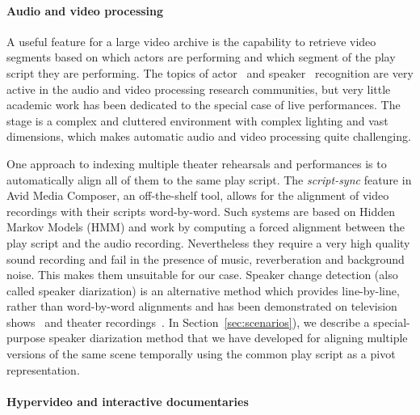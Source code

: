 \documentclass[conference]{IEEEtran}
\begin{document}

\paragraph*{Audio and video processing}
A useful feature for a large video archive is the capability to retrieve video segments based on which actors 
are performing and which segment of the play script they are performing. The topics of actor~\cite{Hilton06} and speaker~\cite{Miro12} recognition are very active in the audio and video processing research communities, but very little academic 
work has been dedicated to the special case of live performances. The stage is a complex and cluttered environment 
with complex lighting and vast dimensions, which makes automatic audio and video processing quite challenging. 

One approach to indexing multiple theater rehearsals and performances is to automatically align
all of them to the same play script. The {\em script-sync} feature in Avid Media Composer,
an off-the-shelf tool, allows for the alignment of video recordings with their scripts word-by-word. Such systems
are based on Hidden Markov Models (HMM) and work by computing  a forced alignment 
between the play script and the audio recording. Nevertheless they require a very high quality 
sound recording and fail in the presence of music, reverberation and background noise. This makes them
unsuitable for our case. Speaker change detection (also called speaker diarization) is an alternative method
which provides line-by-line, rather than word-by-word alignments and has been demonstrated 
on television shows~\cite{Sankar09} and theater recordings~\cite{Caillet13}. In Section~\ref{sec:scenarios}),
we describe a special-purpose speaker diarization method that we have developed for aligning multiple versions 
of the same scene temporally using the common play script as a pivot representation.


\paragraph*{Hypervideo and interactive documentaries}
\end{document}
